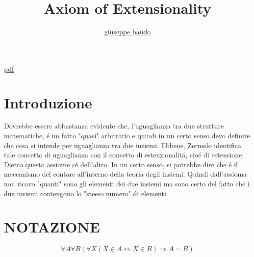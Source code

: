 \documentclass[a4paper,10pt]{article}
\title{Axiom of Extensionality}
\author{\href{http://www.baudo.hol.es}{giuseppe baudo}}
\begin{document}
\maketitle
\href{Extensionality.pdf}{pdf}

\section{Introduzione}
Dovrebbe essere abbastanza evidente che, l'uguaglianza tra due strutture matematiche, \'{e} un fatto "quasi" arbitrario e quindi in un certo senso devo definire che cosa si intende
per uguaglianza tra due insiemi. Ebbene, Zermelo identifica tale concetto di uguaglianza con il concetto di estenzionalit\'{a}, cio\'{e} di estensione. Dietro questo assiome
c\'{e} dell'altro. In un certo senso, si potrebbe dire che \'{e} il meccanismo del contare all'interno della teoria degli insiemi. Quindi dall'assioma non ricavo "quanti" sono
gli elementi dei due insiemi ma sono certo del fatto che i due insiemi contengono lo "stesso numero" di elementi.

\section{NOTAZIONE}
\[
  \forall A \forall B (\forall X (X \in A \Leftrightarrow X \in B ) \Rightarrow A = B)
\]
\end{document}
